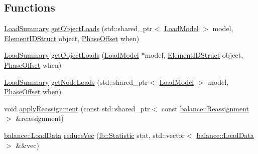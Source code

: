 \subsection*{Functions}
\begin{DoxyCompactItemize}
\item 
\hyperlink{structvt_1_1vrt_1_1collection_1_1balance_1_1_load_summary}{Load\+Summary} \hyperlink{namespacevt_1_1vrt_1_1collection_1_1balance_ae3bc5e1c68d2f55908748501fcba9146}{get\+Object\+Loads} (std\+::shared\+\_\+ptr$<$ \hyperlink{structvt_1_1vrt_1_1collection_1_1balance_1_1_load_model}{Load\+Model} $>$ model, \hyperlink{namespacevt_1_1vrt_1_1collection_1_1balance_a9f5b53fafb270212279a4757d2c4cd28}{Element\+I\+D\+Struct} object, \hyperlink{structvt_1_1vrt_1_1collection_1_1balance_1_1_phase_offset}{Phase\+Offset} when)
\item 
\hyperlink{structvt_1_1vrt_1_1collection_1_1balance_1_1_load_summary}{Load\+Summary} \hyperlink{namespacevt_1_1vrt_1_1collection_1_1balance_a5e4d4bdd2fceaebcb89d669b8a1b2361}{get\+Object\+Loads} (\hyperlink{structvt_1_1vrt_1_1collection_1_1balance_1_1_load_model}{Load\+Model} $\ast$model, \hyperlink{namespacevt_1_1vrt_1_1collection_1_1balance_a9f5b53fafb270212279a4757d2c4cd28}{Element\+I\+D\+Struct} object, \hyperlink{structvt_1_1vrt_1_1collection_1_1balance_1_1_phase_offset}{Phase\+Offset} when)
\item 
\hyperlink{structvt_1_1vrt_1_1collection_1_1balance_1_1_load_summary}{Load\+Summary} \hyperlink{namespacevt_1_1vrt_1_1collection_1_1balance_a3e23892df34e34f78bfa995cad0aa98e}{get\+Node\+Loads} (std\+::shared\+\_\+ptr$<$ \hyperlink{structvt_1_1vrt_1_1collection_1_1balance_1_1_load_model}{Load\+Model} $>$ model, \hyperlink{structvt_1_1vrt_1_1collection_1_1balance_1_1_phase_offset}{Phase\+Offset} when)
\item 
void \hyperlink{namespacevt_1_1vrt_1_1collection_1_1balance_a36a9f7b402e41e88d3840df04e39eb6c}{apply\+Reassignment} (const std\+::shared\+\_\+ptr$<$ const \hyperlink{structvt_1_1vrt_1_1collection_1_1balance_1_1_reassignment}{balance\+::\+Reassignment} $>$ \&reassignment)
\item 
\hyperlink{structvt_1_1vrt_1_1collection_1_1balance_1_1_load_data}{balance\+::\+Load\+Data} \hyperlink{namespacevt_1_1vrt_1_1collection_1_1balance_a4b385056c706c7325c54963e7d9a1b32}{reduce\+Vec} (\hyperlink{namespacevt_1_1vrt_1_1collection_1_1lb_af0e20ef9afee77295053aa83bf1348b1}{lb\+::\+Statistic} stat, std\+::vector$<$ \hyperlink{structvt_1_1vrt_1_1collection_1_1balance_1_1_load_data}{balance\+::\+Load\+Data} $>$ \&\&vec)

\end{DoxyCompactItemize}
